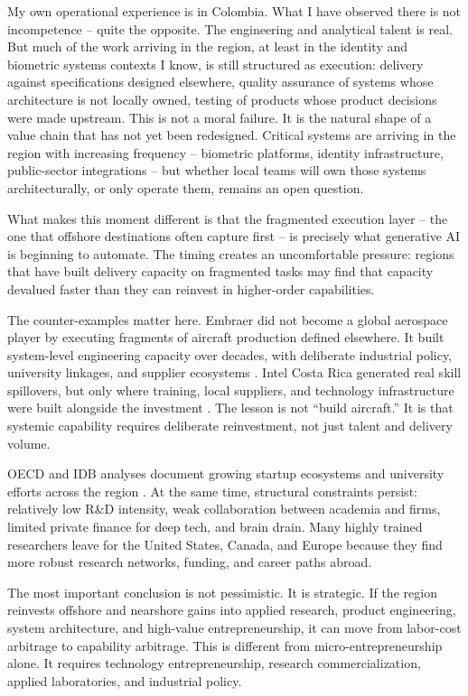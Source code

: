 \documentclass[11pt,a4paper]{article}
\begin{document}
My own operational experience is in Colombia. What I have observed there is not incompetence -- quite the opposite. The engineering and analytical talent is real. But much of the work arriving in the region, at least in the identity and biometric systems contexts I know, is still structured as execution: delivery against specifications designed elsewhere, quality assurance of systems whose architecture is not locally owned, testing of products whose product decisions were made upstream. This is not a moral failure. It is the natural shape of a value chain that has not yet been redesigned. Critical systems are arriving in the region with increasing frequency -- biometric platforms, identity infrastructure, public-sector integrations -- but whether local teams will own those systems architecturally, or only operate them, remains an open question.

What makes this moment different is that the fragmented execution layer -- the one that offshore destinations often capture first -- is precisely what generative AI is beginning to automate. The timing creates an uncomfortable pressure: regions that have built delivery capacity on fragmented tasks may find that capacity devalued faster than they can reinvest in higher-order capabilities.

The counter-examples matter here. Embraer did not become a global aerospace player by executing fragments of aircraft production defined elsewhere. It built system-level engineering capacity over decades, with deliberate industrial policy, university linkages, and supplier ecosystems \citep{bernardes2003embraer,mcmanus2024innovation}. Intel Costa Rica generated real skill spillovers, but only where training, local suppliers, and technology infrastructure were built alongside the investment \citep{worldbank2006intel,oecd_2024_fdi_lac}. The lesson is not ``build aircraft.'' It is that systemic capability requires deliberate reinvestment, not just talent and delivery volume.

OECD and IDB analyses document growing startup ecosystems and university efforts across the region \citep{oecd_idb_2022_universities}. At the same time, structural constraints persist: relatively low R\&D intensity, weak collaboration between academia and firms, limited private finance for deep tech, and brain drain. Many highly trained researchers leave for the United States, Canada, and Europe because they find more robust research networks, funding, and career paths abroad.

The most important conclusion is not pessimistic. It is strategic. If the region reinvests offshore and nearshore gains into applied research, product engineering, system architecture, and high-value entrepreneurship, it can move from labor-cost arbitrage to capability arbitrage. This is different from micro-entrepreneurship alone. It requires technology entrepreneurship, research commercialization, applied laboratories, and industrial policy.
\end{document}
